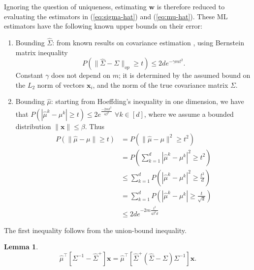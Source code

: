 \documentclass{article}
\newcommand{\bx}{\bm{x}}
\newcommand{\bw}{\bm{w}}
\newcommand{\capB}{\beta}
\newtheorem{lemma}{Lemma}
\begin{document}
Ignoring the question of uniqueness, estimating ${\bw}$ is therefore reduced to evaluating the estimators in (\ref{eq:sigma-hat}) and (\ref{eq:mu-hat}). These ML estimators have the following known upper bounds on their error:
\begin{enumerate}
\item Bounding $\hat\Sigma$: from known results on covariance estimation \citep{DBLP:journals/ftml/Tropp15}, using Bernstein matrix inequality 
\begin{equation}
\label{eq:cov-bound}
    P (\|\hat\Sigma-\Sigma\|_{op} \geq t) \leq 2d e^{-\gamma m t^2}.
\end{equation}
Constant $\gamma$ does not depend on $m$; it is determined by the assumed bound on the $L_2$ norm of vectors $\bx_i$, and the norm of the true covariance matrix $\Sigma$.
\item Bounding $\hat\mu$: starting from Hoeffding's inequality in one dimension, we have that $P (\left |\hat\mu^{k}-\mu^{k}\right | \geq t) \leq 2e^\frac{-2 m t^2}{4\capB^2}$ $\forall k\in [d]$, where we assume a bounded distribution $\|\bx\|\le \capB$. Thus 
\begin{equation}
\label{eq:mean-bound}
\begin{split}
P (\|\hat\mu-\mu\| \geq t) &= P (\|\hat\mu-\mu\|^2 \geq t^2) \\
&= P (\sum_{k=1}^d\left |\hat\mu^{k}-\mu^{k}\right |^2 \geq t^2) \\
&\leq \sum_{k=1}^d P (\left |\hat\mu^{k}-\mu^{k}\right |^2 \geq \frac{t^2}{d})\\
&= \sum_{k=1}^d P (\left |\hat\mu^{k}-\mu^{k}\right | \geq \frac{t}{\sqrt{d}}) \\
&\leq 2 d e^{-2 m \frac{t^2}{4\capB^2 d}}
\end{split}
\end{equation}
\end{enumerate}
The first inequality follows from the union-bound inequality.






\begin{lemma}
\label{thm:new_lemma}
\begin{equation}
\label{eq:simps}
\hat\mu^\top [\Sigma^{-1}-\hat\Sigma^{+}]\bx =\hat\mu^\top  [\hat\Sigma^{+}(\hat\Sigma-\Sigma)\Sigma^{-1}]\bx.
\end{equation}
\end{lemma}
\end{document}
